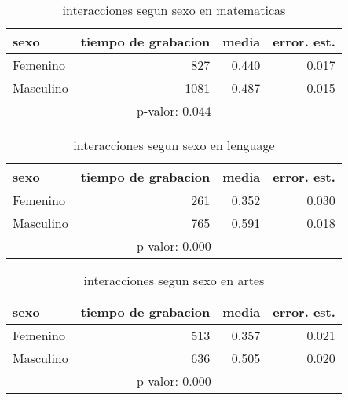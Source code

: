 \documentclass[spanish]{article}
\begin{document}
\begin{table}[h!]
\begin{center}
\begin{tabular}{|l|r|r|r|}
\hline
sexo      & tiempo de grabacion & media          & error. est.    \\ \hline
Femenino  &                 827 &          0.440 &           0.017\\ \hline
Masculino &                1081 &          0.487 &           0.015\\ \hline
\multicolumn{4}{|c|}{p-valor: 0.044} \\ \hline
\end{tabular}
\caption{interacciones segun sexo en matematicas}
\end{center}
\end{table}
\pagebreak
\begin{table}[h!]
\begin{center}
\begin{tabular}{|l|r|r|r|}
\hline
sexo      & tiempo de grabacion & media          & error. est.    \\ \hline
Femenino  &                 261 &          0.352 &           0.030\\ \hline
Masculino &                 765 &          0.591 &           0.018\\ \hline
\multicolumn{4}{|c|}{p-valor: 0.000} \\ \hline
\end{tabular}
\caption{interacciones segun sexo en lenguage}
\end{center}
\end{table}

\begin{table}[h!]
\begin{center}
\begin{tabular}{|l|r|r|r|}
\hline
sexo      & tiempo de grabacion & media          & error. est.    \\ \hline
Femenino  &                 513 &          0.357 &           0.021\\ \hline
Masculino &                 636 &          0.505 &           0.020\\ \hline
\multicolumn{4}{|c|}{p-valor: 0.000} \\ \hline
\end{tabular}
\caption{interacciones segun sexo en artes}
\end{center}
\end{table}
\end{document}
